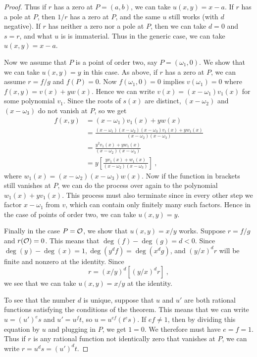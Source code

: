 \begin{proof}
Thus if $r$ has a zero at $P=(a,b)$, we can take $u(x,y)=x-a$. If $r$ has a pole at $P$, then $1/r$ has a zero at $P$, and the same $u$ still works (with $d$ negative). If $r$ has neither a zero nor a pole at $P$, then we can take $d=0$ and $s=r$, and what $u$ is is immaterial. Thus in the generic case, we can take $u(x,y)=x-a$.

Now we assume that $P$ is a point of order two, say $P=(\omega_{1},0)$. We show that we can take $u(x,y)=y$ in this case. As above, if $r$ has a zero at $P$, we can assume $r=f/g$ and $f(P)=0$. Now $f(\omega_{1},0)=0$ implies $v(\omega_{1})=0$ where $f(x,y)=v(x)+yw(x)$. Hence we can write $v(x)=(x-\omega_{1})v_{1}(x)$ for some polynomial $v_{1}$. Since the roots of $s(x)$ are distinct, $(x-\omega_{2})$ and $(x-\omega_{3})$ do not vanish at $P$, so we get
\begin{align*}
f(x,y)&=(x-\omega_{1})v_{1}(x)+yw(x)\\
&=\frac{(x-\omega_{1})(x-\omega_{2})(x-\omega_{3})v_{1}(x)+yw_{1}(x)}{(x-\omega_{2})(x-\omega_{3})}\\
&=\frac{y^{2}v_{1}(x)+yw_{1}(x)}{(x-\omega_{2})(x-\omega_{3})}\\
&=y\left[\frac{yv_{1}(x)+w_{1}(x)}{(x-\omega_{2})(x-\omega_{3})}\right]\ ,
\end{align*}
where $w_{1}(x)=(x-\omega_{2})(x-\omega_{3})w(x)$. Now if the function in brackets still vanishes at $P$, we can do the process over again to the polynomial $w_{1}(x)+yv_{1}(x)$. This process must also terminate since in every other step we factor $x-\omega_{1}$ from $v$, which can contain only finitely many such factors. Hence in the case of points of order two, we can take $u(x, y)=y$.

Finally in the case $P=\mathcal{O}$, we show that $u(x, y)=x/y$ works. Suppose $r=f/g$ and $r(\mathcal{O})=0$. This means that $\deg(f)-\deg(g)=d<0$. Since $\deg(y)-\deg(x)=1,\deg(y^{d}f)=\deg(x^{d}g)$, and $(y/x)^{d}r$ will be finite and nonzero at the identity. Since
$$
r=(x/y)^{d}\left[(y/x)^{d}r\right]\ ,
$$
we see that we can take $u(x, y)=x/y$ at the identity.

To see that the number $d$ is unique, suppose that $u$ and $u'$ are both rational functions satisfying the conditions of the theorem. This means that we can write $u=(u')^{e}s$ and $u'=u^{f}t$, so $u=u^{ef}(t^{e}s)$. If $ef\neq 1$, then by dividing this equation by $u$ and plugging in $P$, we get $1=0$. We therefore must have $e=f=1$. Thus if $r$ is any rational function not identically zero that vanishes at $P$, we can write $r=u^{d}s=(u')^{d}t$.
\end{proof}

